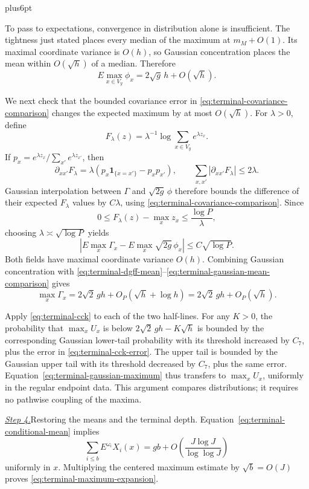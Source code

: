 \documentclass[12pt,reqno]{amsart}
\makeatletter
\theoremstyle{plain}
\theoremstyle{definition}
\theoremstyle{remark}
\renewenvironment{proof}[1][\proofname]{%
  \par
  \pushQED{\qed}%
  \normalfont
  \topsep6pt plus6pt\relax
  \trivlist
  \item[\hskip\labelsep\slshape #1\@addpunct{.}]%
  \ignorespaces
}{%
  \popQED
  \endtrivlist
  \@endpefalse
}
\DeclareRobustCommand{\qed}{%
  \leavevmode\unskip\penalty9999\hbox{}\nobreak
  \ifmmode
    \makebox[0pt][l]{\qquad\hbox{\qedsymbol}}%
  \else
    \qquad\hbox{\qedsymbol}%
  \fi
}
\renewcommand{\qedsymbol}{\rule[.47pt]{4pt}{6pt}}
\numberwithin{equation}{section}
\makeatother
\begin{document}
\begin{proof}
To pass to expectations, convergence in distribution alone is
insufficient.  The tightness just stated places every median of the
maximum at $m_M+O(1)$.  Its maximal coordinate variance is $O(h)$,
so Gaussian concentration places the mean within $O(\sqrt h)$ of
a median.  Therefore
\begin{equation}
 E\max_{x\in V_y}\phi_x=2\sqrt g\,h+O(\sqrt h).
 \label{eq:terminal-dgff-mean}
\end{equation}

We next check that the bounded covariance error in
\eqref{eq:terminal-covariance-comparison} changes the expected
maximum by at most $O(\sqrt h)$.  For $\lambda>0$, define
\[
 F_\lambda(z)=\lambda^{-1}\log\sum_{x\in V_y}e^{\lambda z_x}.
\]
If $p_x=e^{\lambda z_x}/\sum_{x'}e^{\lambda z_{x'}}$, then
\[
 \partial_{xx'}F_\lambda
 =\lambda(p_x\mathbf1_{\{x=x'\}}-p_xp_{x'}),\qquad
 \sum_{x,x'}|\partial_{xx'}F_\lambda|\le2\lambda.
\]
Gaussian interpolation between $\Gamma$ and $\sqrt{2g}\,\phi$
therefore bounds the difference of their expected $F_\lambda$
values by $C\lambda$, using
\eqref{eq:terminal-covariance-comparison}.  Since
\[
 0\le F_\lambda(z)-\max_xz_x\le\frac{\log P}{\lambda},
\]
choosing $\lambda\asymp\sqrt{\log P}$ yields
\begin{equation}
 \left|E\max_x\Gamma_x-E\max_x\sqrt{2g}\,\phi_x\right|
 \le C\sqrt{\log P}.
 \label{eq:terminal-gaussian-mean-comparison}
\end{equation}
Both fields have maximal coordinate variance $O(h)$.  Combining
Gaussian concentration with
\eqref{eq:terminal-dgff-mean}--\eqref{eq:terminal-gaussian-mean-comparison}
gives
\begin{equation}
 \max_x\Gamma_x=2\sqrt2\,g h+O_P(\sqrt h+\log h)
             =2\sqrt2\,g h+O_P(\sqrt h).
 \label{eq:terminal-gaussian-maximum}
\end{equation}

Apply \eqref{eq:terminal-cck} to each of the two half-lines.  For
any $K>0$, the probability that $\max_xU_x$ is below
$2\sqrt2\,gh-K\sqrt h$ is bounded by the corresponding Gaussian
lower-tail probability with its threshold increased by $C_7$, plus
the error in \eqref{eq:terminal-cck-error}.  The upper tail is bounded
by the Gaussian upper tail with its threshold decreased by $C_7$,
plus the same error.  Equation~\eqref{eq:terminal-gaussian-maximum}
thus transfers to $\max_xU_x$, uniformly in the regular endpoint
data.  This argument compares distributions; it requires no
pathwise coupling of the maxima.

\smallskip\noindent
\underline{\textit{Step 4.}}\quad Restoring the means and the terminal depth.
Equation~\eqref{eq:terminal-conditional-mean} implies
\[
 \sum_{i\le b}E^{\omega_i}X_i(x)
 =gb+O\left(\frac{J\log J}{\log\log J}\right)
\]
uniformly in $x$.  Multiplying the centered maximum estimate by
$\sqrt b=O(J)$ proves \eqref{eq:terminal-maximum-expansion}.


\end{proof}
\end{document}
